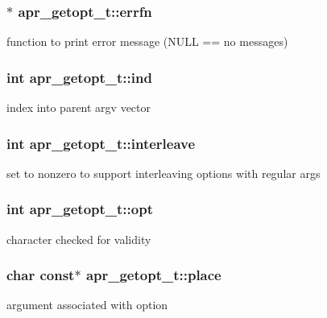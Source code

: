 \subsubsection[{\texorpdfstring{errfn}{errfn}}]{$\ast$ apr\+\_\+getopt\+\_\+t\+::errfn}\hypertarget{structapr__getopt__t_a6bf3fd7ad92d1f0161cd895e1ad50d06}{}\label{structapr__getopt__t_a6bf3fd7ad92d1f0161cd895e1ad50d06}
function to print error message (N\+U\+LL == no messages) 
\subsubsection[{\texorpdfstring{ind}{ind}}]{\setlength{\rightskip}{0pt plus 5cm}int apr\+\_\+getopt\+\_\+t\+::ind}\hypertarget{structapr__getopt__t_ab04d49d670f095c3244dc9792b70ff07}{}\label{structapr__getopt__t_ab04d49d670f095c3244dc9792b70ff07}
index into parent argv vector 
\subsubsection[{\texorpdfstring{interleave}{interleave}}]{\setlength{\rightskip}{0pt plus 5cm}int apr\+\_\+getopt\+\_\+t\+::interleave}\hypertarget{structapr__getopt__t_a771dbef87345c731845dd63723fb34db}{}\label{structapr__getopt__t_a771dbef87345c731845dd63723fb34db}
set to nonzero to support interleaving options with regular args 
\subsubsection[{\texorpdfstring{opt}{opt}}]{\setlength{\rightskip}{0pt plus 5cm}int apr\+\_\+getopt\+\_\+t\+::opt}\hypertarget{structapr__getopt__t_a4f842391b8f8f19e562584fdd29d0654}{}\label{structapr__getopt__t_a4f842391b8f8f19e562584fdd29d0654}
character checked for validity 
\subsubsection[{\texorpdfstring{place}{place}}]{\setlength{\rightskip}{0pt plus 5cm}char const$\ast$ apr\+\_\+getopt\+\_\+t\+::place}\hypertarget{structapr__getopt__t_a87961387d1c71bebfbdf69c7f392d2d5}{}\label{structapr__getopt__t_a87961387d1c71bebfbdf69c7f392d2d5}
argument associated with option 
